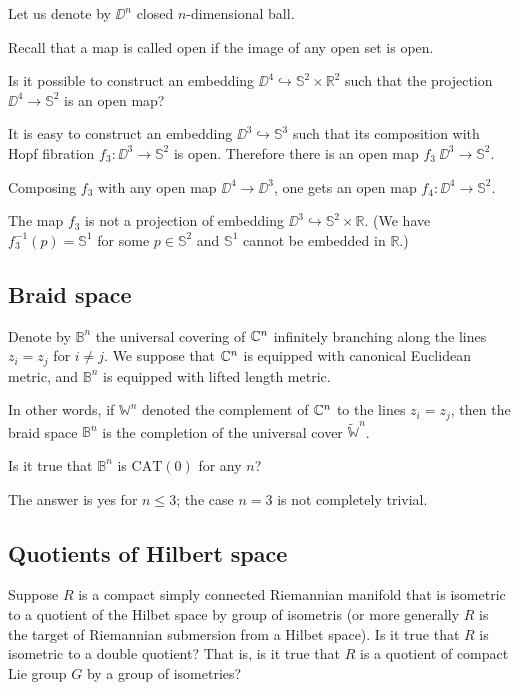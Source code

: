 Let us denote by $\DD^n$ closed $n$-dimensional ball.

Recall that a map is called open if the image of any open set is open.

\begin{pr}
Is it possible to construct an embedding $\DD^4\hookrightarrow \mathbb{S}^2\times
\mathbb R^2$
such that the projection  $\DD^4\to \mathbb{S}^2$ is an open map?
\end{pr}


It is easy to construct an embedding $\DD^3\hookrightarrow \mathbb{S}^3$ such that
its composition with Hopf fibration $f_3:\DD^3\to \mathbb{S}^2$ is open.
Therefore there is an open map $f_3\:\DD^3\to\mathbb{S}^2$.

Composing $f_3$ with any open map $\DD^4\to \DD^3$,
one gets an open map $f_4:\DD^4\to \mathbb{S}^2$.

The map $f_3$ is not a projection of embedding  $\DD^3\hookrightarrow \mathbb{S}^2\times\mathbb R$.
(We have $f_3^{-1}(p)=\mathbb{S}^1$ for some $p\in \mathbb{S}^2$ and $\mathbb{S}^1$ cannot be embedded in $\mathbb R$.)  


\subsection*{Braid space}

Denote by $\mathbb{B}^n$ the universal covering of $\mathbb{C}^n$ infinitely branching along the lines $z_i=z_j$ for $i\ne j$.
We suppose that $\mathbb{C}^n$ is equipped with canonical Euclidean metric, 
and $\mathbb{B}^n$ is equipped with lifted length metric.

In other words, if $\mathbb{W}^n$ denoted the complement of $\mathbb{C}^n$ to the lines $z_i=z_j$,
then the braid space $\mathbb{B}^n$ is the completion of the universal cover  $\tilde{\mathbb{W}}^n$.

\begin{pr}
Is it true that $\mathbb{B}^n$ is $\mathrm{CAT}(0)$ for any $n$? 
\end{pr}

The answer is yes for $n\le 3$; the case $n=3$ is not completely trivial.

\subsection*{Quotients of Hilbert space}

\begin{pr} Suppose $R$ is a compact simply connected Riemannian manifold that is isometric to a quotient of the Hilbet space by group of isometris (or more generally $R$ is the target of Riemannian submersion from a Hilbet space).
Is it true that $R$ is isometric to a double quotient? That is, is it true that $R$ is a quotient of compact Lie group $G$ by a group of isometries?
 
\end{pr}

